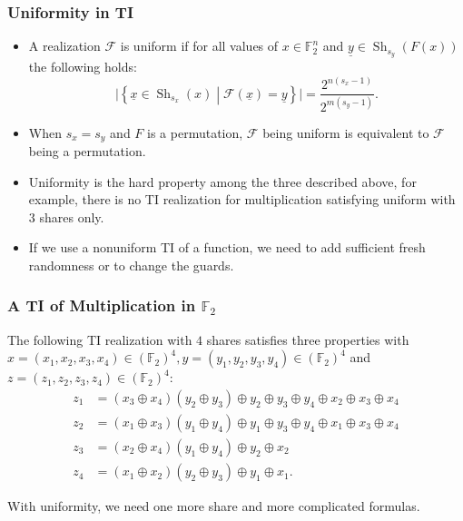 \documentclass[
    aspectratio=169,                   %
]{beamer}
\newcommand{\F}{\mathbb{F}}
\begin{document}
    \begin{frame}
        \frametitle{Uniformity in TI}
        \begin{itemize}
            \item A realization $ \mathcal{F} $ is uniform if for all values of $ x\in\F_2^n $ and $ \underline{y}\in\operatorname{Sh}_{s_y}(F(x)) $ the following holds:
            \[\lvert\left\{ \underline{x}\in\operatorname{Sh}_{s_x}(x)\middle|\mathcal{F}(\underline{x})=\underline{y} \right\}\rvert=\frac{2^{n(s_x-1)}}{2^{m(s_y-1)}}.\]
            \item When $ s_x=s_y $ and $ F $ is a permutation, $ \mathcal{F} $ being uniform is equivalent to $ \mathcal{F} $ being a permutation. 
            \item Uniformity is the hard property among the three described above, for example, there is no TI  realization for multiplication satisfying uniform with $ 3 $ shares only. 
            \item If we use a nonuniform TI of a function, we need to add sufficient fresh randomness or to change the guards.  
        \end{itemize}
    \end{frame}

    \begin{frame}
        \frametitle{A TI of Multiplication in $ \F_2 $}
        \begin{example}
            The following TI realization with $ 4 $ shares satisfies three properties with $ x=(x_1,x_2,x_3,x_4)\in(\F_2)^4,y=(y_1,y_2,y_3,y_4)\in(\F_2)^4 $ and $ z=(z_1,z_2,z_3,z_4)\in(\F_2)^4 $: 
            \begin{align*}
                z_1&=\left(x_3 \oplus x_4\right)\left(y_2 \oplus y_3\right) \oplus y_2 \oplus y_3 \oplus y_4 \oplus x_2 \oplus x_3 \oplus x_4 \\
                z_2&=\left(x_1 \oplus x_3\right)\left(y_1 \oplus y_4\right) \oplus y_1 \oplus y_3 \oplus y_4 \oplus x_1 \oplus x_3 \oplus x_4 \\
                z_3&=\left(x_2 \oplus x_4\right)\left(y_1 \oplus y_4\right) \oplus y_2 \oplus x_2 \\
                z_4&=\left(x_1 \oplus x_2\right)\left(y_2 \oplus y_3\right) \oplus y_1 \oplus x_1.
            \end{align*}
        \end{example}
        \begin{remark}
            With uniformity, we need one more share and more complicated formulas.
        \end{remark}
    \end{frame}
\end{document}
